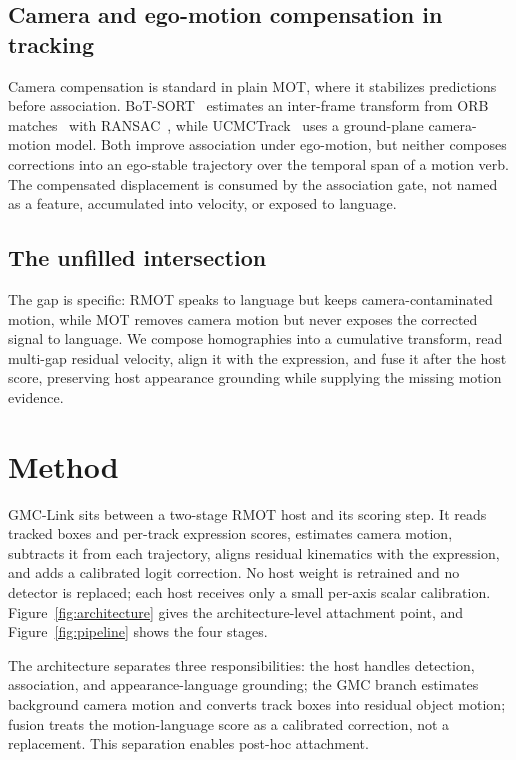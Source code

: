 \documentclass[sigconf,review,anonymous]{acmart}
\begin{document}
\subsection{Camera and ego-motion compensation in tracking}
Camera compensation is standard in plain MOT, where it stabilizes predictions before association. BoT-SORT~\cite{botsort} estimates an inter-frame transform from ORB matches~\cite{orb} with RANSAC~\cite{ransac}, while UCMCTrack~\cite{ucmctrack} uses a ground-plane camera-motion model. Both improve association under ego-motion, but neither composes corrections into an ego-stable trajectory over the temporal span of a motion verb. The compensated displacement is consumed by the association gate, not named as a feature, accumulated into velocity, or exposed to language.

\subsection{The unfilled intersection}
The gap is specific: RMOT speaks to language but keeps camera-contaminated motion, while MOT removes camera motion but never exposes the corrected signal to language. We compose homographies into a cumulative transform, read multi-gap residual velocity, align it with the expression, and fuse it after the host score, preserving host appearance grounding while supplying the missing motion evidence.

\section{Method}
\label{sec:method}

GMC-Link sits between a two-stage RMOT host and its scoring step. It reads tracked boxes and per-track expression scores, estimates camera motion, subtracts it from each trajectory, aligns residual kinematics with the expression, and adds a calibrated logit correction. No host weight is retrained and no detector is replaced; each host receives only a small per-axis scalar calibration. Figure~\ref{fig:architecture} gives the architecture-level attachment point, and Figure~\ref{fig:pipeline} shows the four stages.

The architecture separates three responsibilities: the host handles detection, association, and appearance-language grounding; the GMC branch estimates background camera motion and converts track boxes into residual object motion; fusion treats the motion-language score as a calibrated correction, not a replacement. This separation enables post-hoc attachment.
\end{document}
